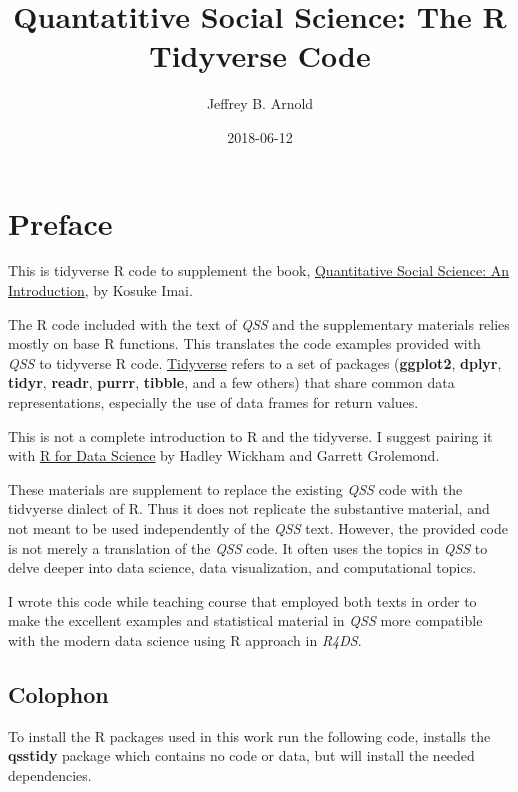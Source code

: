 \documentclass[]{book}
\title{Quantatitive Social Science: The R Tidyverse Code}
\author{Jeffrey B. Arnold}
\date{2018-06-12}
\theoremstyle{definition}
\theoremstyle{definition}
\theoremstyle{definition}
\theoremstyle{remark}
\begin{document}
\maketitle

{
\setcounter{tocdepth}{1}
\tableofcontents
}
\chapter*{Preface}\label{preface}

This is tidyverse R code to supplement the book,
\href{http://press.princeton.edu/titles/11025.html}{Quantitative Social
Science: An Introduction}, by Kosuke Imai.

The R code included with the text of \emph{QSS} and the supplementary
materials relies mostly on base R functions. This translates the code
examples provided with \emph{QSS} to tidyverse R code.
\href{https://github.com/tidyverse/tidyverse}{Tidyverse} refers to a set
of packages (\textbf{ggplot2}, \textbf{dplyr}, \textbf{tidyr},
\textbf{readr}, \textbf{purrr}, \textbf{tibble}, and a few others) that
share common data representations, especially the use of data frames for
return values.

This is not a complete introduction to R and the tidyverse. I suggest
pairing it with \href{http://r4ds.had.co.nz/}{R for Data Science} by
Hadley Wickham and Garrett Grolemond.

These materials are supplement to replace the existing \emph{QSS} code
with the tidvyerse dialect of R. Thus it does not replicate the
substantive material, and not meant to be used independently of the
\emph{QSS} text. However, the provided code is not merely a translation
of the \emph{QSS} code. It often uses the topics in \emph{QSS} to delve
deeper into data science, data visualization, and computational topics.

I wrote this code while teaching course that employed both texts in
order to make the excellent examples and statistical material in
\emph{QSS} more compatible with the modern data science using R approach
in \emph{R4DS}.

\section*{Colophon}\label{colophon}

To install the R packages used in this work run the following code,
installs the \textbf{qsstidy} package which contains no code or data,
but will install the needed dependencies.
\end{document}
